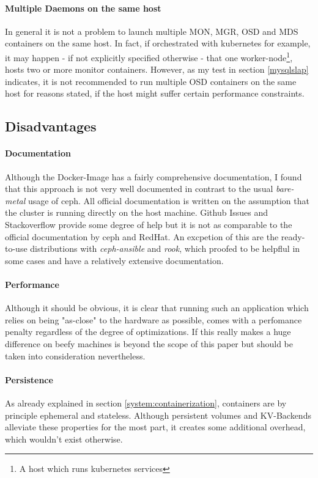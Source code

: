 \documentclass[titlepage, a4paper, 11pt]{scrartcl}
\begin{document}
            \paragraph{Multiple Daemons on the same host} In general it is not a problem to launch multiple MON, MGR, OSD and MDS containers on the same host. In fact, if orchestrated with kubernetes for example, it may happen - if not explicitly specified otherwise - that one worker-node\footnote{A host which runs kubernetes services}, hosts two or more monitor containers. However, as my test in section \ref{mysqlslap} indicates, it is not recommended to run multiple OSD containers on the same host for reasons stated, if the host might suffer certain performance constraints.

        \subsection{Disadvantages}

            \paragraph{Documentation} Although the Docker-Image has a fairly comprehensive documentation, I found that this approach is not very well documented in contrast to the usual \textit{bare-metal} usage of ceph. All official documentation is written on the assumption that the cluster is running directly on the host machine. Github Issues and Stackoverflow provide some degree of help but it is not as comparable to the official documentation by ceph and RedHat. An excpetion of this are the ready-to-use distributions with \textit{ceph-ansible} and \textit{rook}, which proofed to be helpflul in some cases and have a relatively extensive documentation.

            \paragraph{Performance} Although it should be obvious, it is clear that running such an application which relies on being "as-close" to the hardware as possible, comes with a perfomance penalty regardless of the degree of optimizations. If this really makes a huge difference on beefy machines is beyond the scope of this paper but should be taken into consideration nevertheless. 

            \paragraph{Persistence} As already explained in section \ref*{system:containerization}, containers are by principle ephemeral and stateless. Although persistent volumes and KV-Backends alleviate these properties for the most part, it creates some additional overhead, which wouldn't exist otherwise.
\end{document}
